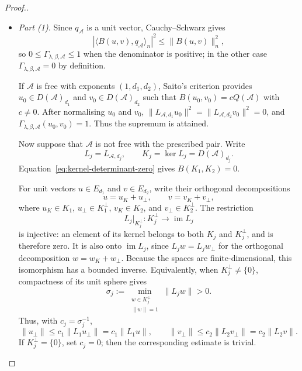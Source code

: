 \documentclass[pdflatex,sn-mathphys-num]{sn-jnl}%
\theoremstyle{remark}
\theoremstyle{definition}
\begin{document}
\begin{proof}[Proof.]
\leavevmode\par\medskip
\begin{itemize}
\item \emph{Part (1).}
Since $q_{\mathcal{A}}$ is a unit vector, Cauchy--Schwarz gives
\[
|\langle B(u,v),q_{\mathcal{A}}\rangle_n|^2
\leq\|B(u,v)\|_n^2,
\]
so $0\leq\Gamma_{\lambda,\beta,\mathcal{A}}\leq1$ when the denominator is
 positive; in the other case $\Gamma_{\lambda,\beta, \mathcal{A}}=0$ by definition.

If $\mathcal{A}$ is free with exponents $(1,d_1,d_2)$, Saito's criterion provides $u_0\in D(\mathcal{A})_{d_1}$ and $v_0\in D(\mathcal{A})_{d_2}$ such that $B(u_0,v_0)=cQ({\mathcal{A}})$ with $c\neq0$. After normalising $u_0$ and $v_0$, $\|L_{\mathcal{A},d_1}u_0\|^2=\|L_{\mathcal{A},d_2}v_0\|^2=0$, and $\Gamma_{\lambda,\beta,\mathcal{A}}(u_0,v_0)=1$. Thus the supremum is attained.

Now suppose that $\mathcal{A}$ is not free with the prescribed pair. Write
\[
L_j=L_{\mathcal{A},d_j},
\qquad
K_j=\ker L_j=D(\mathcal{A})_{d_j}.
\]
Equation~\eqref{eq:kernel-determinant-zero} gives $B(K_1,K_2)=0$.

For unit vectors $u\in E_{d_1}$ and $v\in E_{d_2}$, write their orthogonal decompositions
\[
u=u_K+u_\perp,
\qquad
v=v_K+v_\perp,
\]
where $u_K\in K_1$, $u_\perp\in K_1^\perp$, $v_K\in K_2$, and $v_\perp\in K_2^\perp$. The restriction
\[
L_j|_{K_j^\perp}:K_j^\perp\longrightarrow \operatorname{im}L_j
\]
is injective: an element of its kernel belongs to both $K_j$ and $K_j^\perp$, and is therefore zero. It is also onto $\operatorname{im}L_j$, since $L_jw=L_jw_\perp$ for the orthogonal decomposition $w=w_K+w_\perp$. Because the spaces are finite-dimensional, this isomorphism has a bounded inverse. Equivalently, when $K_j^\perp\neq\{0\}$, compactness of its unit sphere gives
\[
\sigma_j:=
\min_{\substack{w\in K_j^\perp\\ \|w\|=1}}
\|L_jw\|>0.
\]
Thus, with $c_j=\sigma_j^{-1}$,
\[
\|u_\perp\|\leq c_1\|L_1u_\perp\|
   =c_1\|L_1u\|,
\qquad
\|v_\perp\|\leq c_2\|L_2v_\perp\|
   =c_2\|L_2v\|.
\]
If $K_j^\perp=\{0\}$, set $c_j=0$; then the corresponding estimate is trivial.


\end{itemize}
\end{proof}
\end{document}
